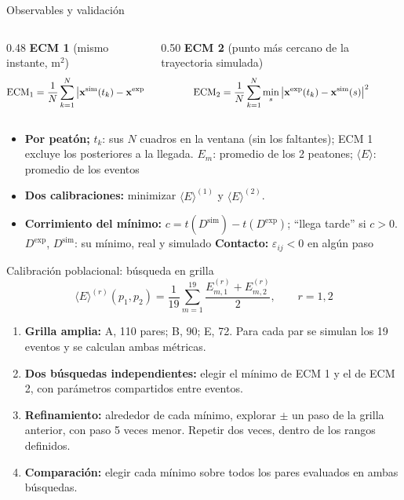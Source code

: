 \documentclass[aspectratio=43,11pt]{beamer}
\begin{document}
\begin{frame}{Observables y validación}
  \setlength{\abovedisplayskip}{2pt}\setlength{\belowdisplayskip}{2pt}
  \small
  \begin{columns}[T,onlytextwidth]
    \begin{column}{0.48\textwidth}
      \textbf{ECM 1} (mismo instante, m$^2$)
      \[ \scalebox{0.9}{$\displaystyle \mathrm{ECM}_1 = \frac{1}{N}\sum_{k=1}^{N} \left|\mathbf{x}^{\mathrm{sim}}(t_k) - \mathbf{x}^{\mathrm{exp}}(t_k)\right|^2$} \]
    \end{column}
    \begin{column}{0.50\textwidth}
      \textbf{ECM 2} (punto más cercano de la trayectoria simulada)
      \[ \scalebox{0.9}{$\displaystyle \mathrm{ECM}_2 = \frac{1}{N}\sum_{k=1}^{N} \min_{s}\left|\mathbf{x}^{\mathrm{exp}}(t_k) - \mathbf{x}^{\mathrm{sim}}(s)\right|^2$} \]
    \end{column}
  \end{columns}
  \begin{itemize}[itemsep=0pt,topsep=0pt]\footnotesize
    \item \textbf{Por peatón;} $t_k$: sus $N$ cuadros en la ventana (sin los faltantes); ECM 1 excluye los posteriores a la llegada. $E_m$: promedio de los 2 peatones; $\langle E\rangle$: promedio de los eventos
    \item \textbf{Dos calibraciones:} minimizar $\langle E\rangle^{(1)}$ y $\langle E\rangle^{(2)}$.
    \item \textbf{Corrimiento del mínimo:} $c = t(D^{\mathrm{sim}}) - t(D^{\mathrm{exp}})$; ``llega tarde'' si $c > 0$.  $D^{\mathrm{exp}}$, $D^{\mathrm{sim}}$: su mínimo, real y simulado \textbf{Contacto:} $\varepsilon_{ij} < 0$ en algún paso
  \end{itemize}
\end{frame}

\begin{frame}{Calibración poblacional: búsqueda en grilla}
  \footnotesize
  \setlength{\abovedisplayskip}{3pt}\setlength{\belowdisplayskip}{3pt}
  \[
    \langle E\rangle^{(r)}(p_1,p_2)
    =\frac{1}{19}\sum_{m=1}^{19}\frac{E_{m,1}^{(r)}+E_{m,2}^{(r)}}{2},
    \qquad r=1,2
  \]
  \begin{enumerate}[label=\arabic*.,leftmargin=5mm,itemsep=1mm]
    \item \textbf{Grilla amplia:} A, 110 pares; B, 90; E, 72. Para cada par se simulan los 19 eventos y se calculan ambas métricas.
    \item \textbf{Dos búsquedas independientes:} elegir el mínimo de ECM 1 y el de ECM 2, con parámetros compartidos entre eventos.
    \item \textbf{Refinamiento:} alrededor de cada mínimo, explorar $\pm$ un paso de la grilla anterior, con paso 5 veces menor. Repetir dos veces, dentro de los rangos definidos.
    \item \textbf{Comparación:} elegir cada mínimo sobre todos los pares evaluados en ambas búsquedas.
  \end{enumerate}
  \vspace{1mm}
\end{frame}
\end{document}
